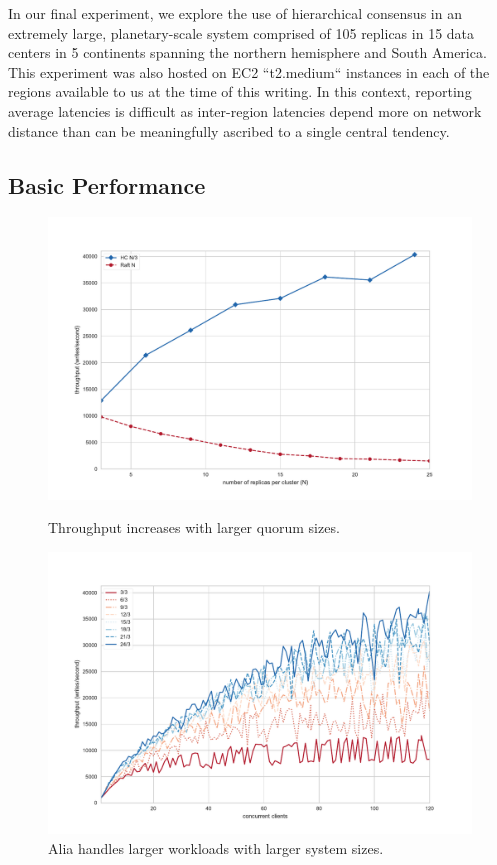 \documentclass[10pt,conference]{IEEEtran}
\begin{document}
In our final experiment, we explore the use of hierarchical consensus in an extremely
large, planetary-scale system comprised of 105 replicas in 15 data centers in 5
continents spanning the northern hemisphere and South America. This experiment was also
hosted on EC2 ``t2.medium`` instances in each of the regions available to us at the time
of this writing. In this context, reporting average latencies is difficult as
inter-region latencies depend more on network distance than can be meaningfully
ascribed to a single central tendency.

\subsection{Basic Performance}
\label{section:performance}

\begin{figure}[t]
    \centering
        \includegraphics[width=\linewidth]{figures/scaling.pdf}
        \caption{Throughput increases with larger quorum sizes.}
        \label{fig:scaling_consensus}
    \endminipage\hfill
        \includegraphics[width=\linewidth]{figures/hc_throughput_workload.pdf}
        \caption{Alia handles larger workloads with larger system sizes.}
        \label{fig:throughput_workload}
    \endminipage
\end{figure}
\end{document}
